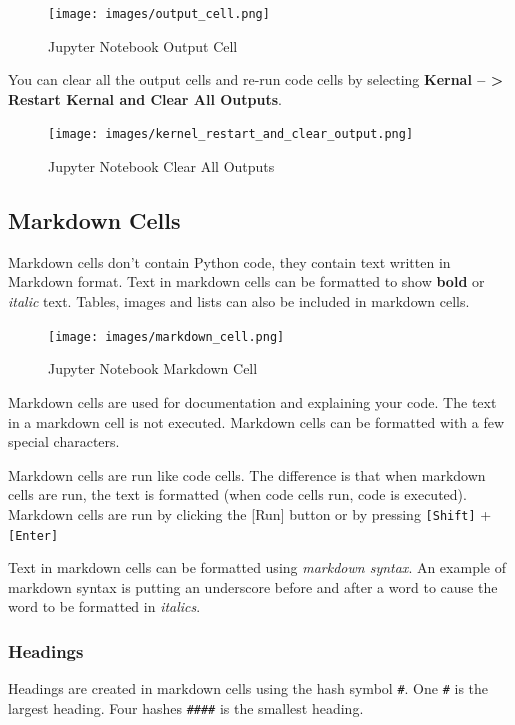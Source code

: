 \documentclass{book}
\begin{document}
\begin{figure}
\centering
\texttt{[image: images/output\_cell.png]}
\caption{Jupyter Notebook Output Cell}
\end{figure}

You can clear all the output cells and re-run code cells by selecting
\textbf{Kernal -- \textgreater{} Restart Kernal and Clear All Outputs}.

\begin{figure}
\centering
\texttt{[image: images/kernel\_restart\_and\_clear\_output.png]}
\caption{Jupyter Notebook Clear All Outputs}
\end{figure}
    




    
        \subsection{Markdown Cells}\label{markdown-cells}

Markdown cells don't contain Python code, they contain text written in
Markdown format. Text in markdown cells can be formatted to show
\textbf{bold} or \emph{italic} text. Tables, images and lists can also
be included in markdown cells.

\begin{figure}
\centering
\texttt{[image: images/markdown\_cell.png]}
\caption{Jupyter Notebook Markdown Cell}
\end{figure}

Markdown cells are used for documentation and explaining your code. The
text in a markdown cell is not executed. Markdown cells can be formatted
with a few special characters.

Markdown cells are run like code cells. The difference is that when
markdown cells are run, the text is formatted (when code cells run, code
is executed). Markdown cells are run by clicking the {[}Run{]} button or
by pressing \lstinline![Shift]! + \lstinline![Enter]!

Text in markdown cells can be formatted using \emph{markdown syntax}. An
example of markdown syntax is putting an underscore before and after a
word to cause the word to be formatted in \emph{italics}.

\subsubsection{Headings}\label{headings}

Headings are created in markdown cells using the hash symbol
\lstinline!#!. One \lstinline!#! is the largest heading. Four hashes
\lstinline!####! is the smallest heading.
\end{document}
